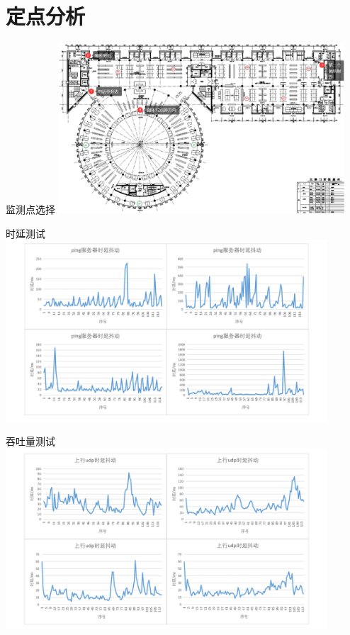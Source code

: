 \documentclass[aspectratio=169]{beamer}
\begin{document}
    \section{定点分析}
    \begin{frame}{监测点选择}
      \includegraphics[width=0.8\textwidth]{resources/监测点选择.png}
    \end{frame}

    \begin{frame}{时延测试}
      \includegraphics[width=0.9\textwidth]{resources/时延测试.png}
    \end{frame}

    \begin{frame}{吞吐量测试}
      \includegraphics[width=0.9\textwidth]{resources/吞吐量测试.png}
    \end{frame}
\end{document}
